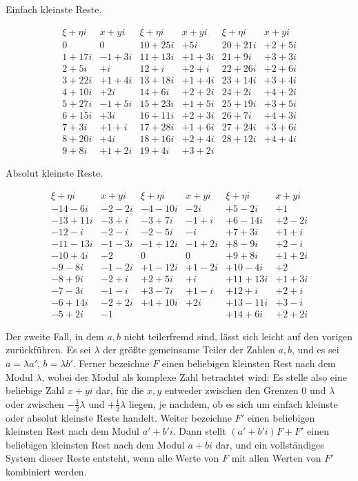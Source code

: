 \begin{center}Einfach kleinste Reste.\end{center}
{\small\setlength{\arraycolsep}{3pt}
\[
\begin{array}{r|r||r|r||r|r}
\xi+\eta i&x+yi&\xi+\eta i&x+yi&\xi+\eta i&x+yi\\\hline
0&0&10+25i&+5i&20+21i&+2+5i\\
1+17i&-1+3i&11+13i&+1+3i&21+9i&+3+3i\\
2+5i&+i&12+i&+2+i&22+26i&+2+6i\\
3+22i&+1+4i&13+18i&+1+4i&23+14i&+3+4i\\
4+10i&+2i&14+6i&+2+2i&24+2i&+4+2i\\
5+27i&-1+5i&15+23i&+1+5i&25+19i&+3+5i\\
6+15i&+3i&16+11i&+2+3i&26+7i&+4+3i\\
7+3i&+1+i&17+28i&+1+6i&27+24i&+3+6i\\
8+20i&+4i&18+16i&+2+4i&28+12i&+4+4i\\
9+8i&+1+2i&19+4i&+3+2i&&
\end{array}
\]
}

%
\begin{center}Absolut kleinste Reste.\end{center}
{\small\setlength{\arraycolsep}{3pt}
\[
\begin{array}{r|r||r|r||r|r}
\xi+\eta i&x+yi&\xi+\eta i&x+yi&\xi+\eta i&x+yi\\\hline
-14-6i&-2-2i&-4-10i&-2i&+5-2i&+1\\
-13+11i&-3+i&-3+7i&-1+i&+6-14i&+2-2i\\
-12-i&-2-i&-2-5i&-i&+7+3i&+1+i\\
-11-13i&-1-3i&-1+12i&-1+2i&+8-9i&+2-i\\
-10+4i&-2&0&0&+9+8i&+1+2i\\
-9-8i&-1-2i&+1-12i&+1-2i&+10-4i&+2\\
-8+9i&-2+i&+2+5i&+i&+11+13i&+1+3i\\
-7-3i&-1-i&+3-7i&+1-i&+12+i&+2+i\\
-6+14i&-2+2i&+4+10i&+2i&+13-11i&+3-i\\
-5+2i&-1&&&+14+6i&+2+2i
\end{array}
\]
}

Der zweite Fall, in dem $a,b$ nicht teilerfremd sind, lässt sich leicht auf den vorigen zurückführen. Es sei $\lambda$ der größte gemeinsame Teiler der Zahlen $a,b$, und es sei $a=\lambda a'$, $b=\lambda b'$. Ferner bezeichne $F$ einen beliebigen kleinsten Rest nach dem Modul $\lambda$, wobei der Modul als komplexe Zahl betrachtet wird: Es stelle also eine beliebige Zahl $x+yi$ dar, für die $x,y$ entweder zwischen den Grenzen $0$ und $\lambda$ oder zwischen $-\frac12\lambda$ und $+\frac12\lambda$ liegen, je nachdem, ob es sich um einfach kleinste oder absolut kleinste Reste handelt. Weiter bezeichne $F'$ einen beliebigen kleinsten Rest nach dem Modul $a'+b'i$. Dann stellt $(a'+b'i)F+F'$ einen beliebigen kleinsten Rest nach dem Modul $a+bi$ dar, und ein vollständiges System dieser Reste entsteht, wenn alle Werte von $F$ mit allen Werten von $F'$ kombiniert werden.


